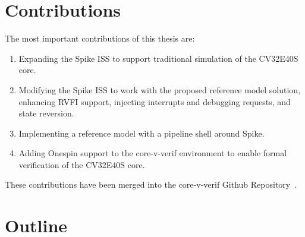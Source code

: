 



\section{Contributions}

The most important contributions of this thesis are:

\begin{enumerate}
    \item Expanding the Spike ISS to support traditional simulation of the CV32E40S core.
    \item Modifying the Spike ISS to work with the proposed reference model solution, enhancing RVFI support, injecting interrupts and debugging requests, and state reversion.
    \item Implementing a reference model with a pipeline shell around Spike.
    \item Adding Onespin support to the core-v-verif environment to enable formal verification of the CV32E40S core.
\end{enumerate}

These contributions have been merged into the core-v-verif Github Repository~\cite{openhwgroupOpenhwgroupCorevverif2023}.


\section{Outline}


